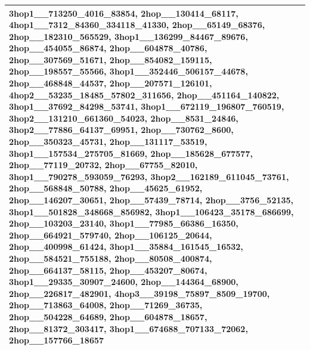 \documentclass{article} %
\begin{document}
\begin{table}[h!]
\begin{tabular}{|p{12cm}|}
3hop1\_\_713250\_4016\_83854, 2hop\_\_130414\_68117, 4hop1\_\_7312\_84360\_334118\_41330, 2hop\_\_65149\_68376, 2hop\_\_182310\_565529, 3hop1\_\_136299\_84467\_89676, 2hop\_\_454055\_86874, 2hop\_\_604878\_40786, 2hop\_\_307569\_51671, 2hop\_\_854082\_159115, 2hop\_\_198557\_55566, 3hop1\_\_352446\_506157\_44678, 2hop\_\_468848\_44537, 2hop\_\_207571\_126101, 4hop2\_\_53235\_18485\_57802\_311656, 2hop\_\_451164\_140822, 3hop1\_\_37692\_84298\_53741, 3hop1\_\_672119\_196807\_760519, 3hop2\_\_131210\_661360\_54023, 2hop\_\_8531\_24846, 3hop2\_\_77886\_64137\_69951, 2hop\_\_730762\_8600, 2hop\_\_350323\_45731, 2hop\_\_131117\_53519, 3hop1\_\_157534\_275705\_81669, 2hop\_\_185628\_677577, 2hop\_\_77119\_20732, 2hop\_\_67755\_82010, 3hop1\_\_790278\_593059\_76293, 3hop2\_\_162189\_611045\_73761, 2hop\_\_568848\_50788, 2hop\_\_45625\_61952, 2hop\_\_146207\_30651, 2hop\_\_57439\_78714, 2hop\_\_3756\_52135, 3hop1\_\_501828\_348668\_856982, 3hop1\_\_106423\_35178\_686699, 2hop\_\_103203\_23140, 3hop1\_\_77985\_66386\_16350, 2hop\_\_664921\_579740, 2hop\_\_106125\_20644, 2hop\_\_400998\_61424, 3hop1\_\_35884\_161545\_16532, 2hop\_\_584521\_755188, 2hop\_\_80508\_400874, 2hop\_\_664137\_58115, 2hop\_\_453207\_80674, 3hop1\_\_29335\_30907\_24600, 2hop\_\_144364\_68900, 2hop\_\_226817\_482901, 4hop3\_\_39198\_75897\_8509\_19700, 2hop\_\_713863\_64008, 2hop\_\_71269\_36735, 2hop\_\_504228\_64689, 2hop\_\_604878\_18657, 2hop\_\_81372\_303417, 3hop1\_\_674688\_707133\_72062, 2hop\_\_157766\_18657\\
\bottomrule
    \end{tabular}
\end{table}
\end{document}

